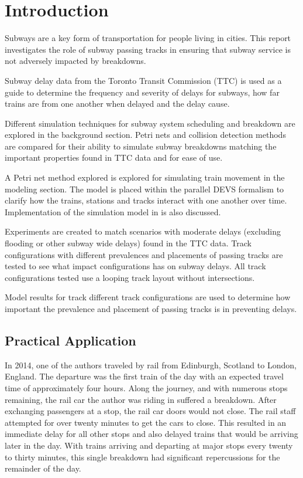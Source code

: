 \section{Introduction}

Subways are a key form of transportation for people living in cities. This
report investigates the role of subway passing tracks in ensuring that subway
service is not adversely impacted by breakdowns.

Subway delay data from the Toronto Transit Commission (TTC) is used as a guide
to determine the frequency and severity of delays for subways, how far trains
are from one another when delayed and the delay cause.

Different simulation techniques for subway system scheduling and breakdown are
explored in the background section. Petri nets and collision detection methods
are compared for their ability to simulate subway breakdowns matching the
important properties found in TTC data and for ease of use. 

A Petri net method explored is explored for simulating train movement in the
modeling section. The model is placed within the parallel DEVS formalism to
clarify how the trains, stations and tracks interact with one another over time.
Implementation of the simulation model in  is also discussed.

Experiments are created to match scenarios with moderate delays (excluding
flooding or other subway wide delays) found in the TTC data. Track
configurations with different prevalences and placements of passing tracks are
tested to see what impact configurations has on subway delays. All track
configurations tested use a looping track layout without intersections.

Model results for track different track configurations are used to determine how
important the prevalence and placement of passing tracks is in preventing
delays. 

\subsection{Practical Application}

In 2014, one of the authors traveled by rail from Edinburgh, Scotland to London,
England.  The departure was the first train of the day with an expected travel
time of approximately four hours. Along the journey, and with numerous stops
remaining, the rail car the author was riding in suffered a breakdown.  After
exchanging passengers at a stop, the rail car doors would not close.  The rail
staff attempted for over twenty minutes to get the cars to close.  This resulted
in an immediate delay for all other stops and also delayed trains that would be
arriving later in the day.  With trains arriving and departing at major stops
every twenty to thirty minutes, this single breakdown had significant
repercussions for the remainder of the day. 

